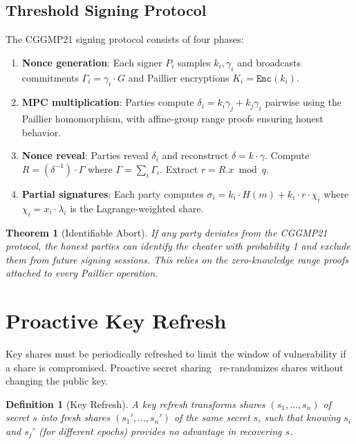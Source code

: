 \documentclass[11pt]{article}
\newtheorem{theorem}{Theorem}
\newtheorem{definition}{Definition}
\begin{document}
\subsection{Threshold Signing Protocol}

The CGGMP21 signing protocol consists of four phases:

\begin{enumerate}[leftmargin=1.4em]
    \item \textbf{Nonce generation}: Each signer $P_i$ samples $k_i, \gamma_i$
    and broadcasts commitments $\Gamma_i = \gamma_i \cdot G$ and Paillier
    encryptions $K_i = \texttt{Enc}(k_i)$.
    \item \textbf{MPC multiplication}: Parties compute $\delta_i = k_i \gamma_j
    + k_j \gamma_i$ pairwise using the Paillier homomorphism, with
    affine-group range proofs ensuring honest behavior.
    \item \textbf{Nonce reveal}: Parties reveal $\delta_i$ and reconstruct
    $\delta = k \cdot \gamma$. Compute $R = (\delta^{-1}) \cdot \Gamma$ where
    $\Gamma = \sum_i \Gamma_i$. Extract $r = R.x \bmod q$.
    \item \textbf{Partial signatures}: Each party computes $\sigma_i = k_i
    \cdot H(m) + k_i \cdot r \cdot \chi_i$ where $\chi_i = x_i \cdot
    \lambda_i$ is the Lagrange-weighted share.
\end{enumerate}

\begin{theorem}[Identifiable Abort]
If any party deviates from the CGGMP21 protocol, the honest parties can
identify the cheater with probability 1 and exclude them from future signing
sessions. This relies on the zero-knowledge range proofs attached to every
Paillier operation.
\end{theorem}

\section{Proactive Key Refresh}
\label{sec:refresh}

Key shares must be periodically refreshed to limit the window of vulnerability
if a share is compromised. Proactive secret sharing~\cite{herzberg1995}
re-randomizes shares without changing the public key.

\begin{definition}[Key Refresh]
A key refresh transforms shares $(s_1, \ldots, s_n)$ of secret $s$ into fresh
shares $(s_1', \ldots, s_n')$ of the same secret $s$, such that knowing $s_i$
and $s_j'$ (for different epochs) provides no advantage in recovering $s$.
\end{definition}
\end{document}
